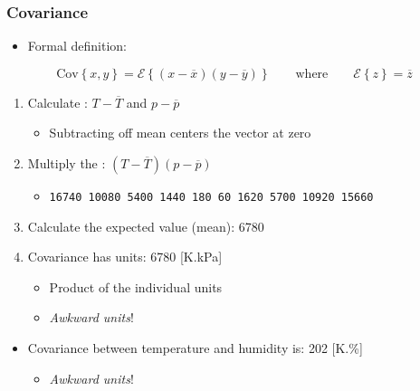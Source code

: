 \begin{frame}\frametitle{Covariance}
	\begin{itemize}
		\item	Formal definition:
	\end{itemize}
	$$ \text{Cov}\left\{x, y\right\} = \mathcal{E}\left\{ (x - \overline{x}) (y - \overline{y})\right\} \qquad \text{where} \qquad \mathcal{E}\left\{ z \right\} = \overline{z} $$

	\begin{enumerate}
		\item	Calculate {\color{purple}{deviation variables}}: $T - \overline{T}$ and $p - \overline{p}$
		\begin{itemize}
			\item	Subtracting off mean centers the vector at zero
		\end{itemize}
		\item	Multiply the {\color{purple}{centered vectors}}: $(T - \overline{T}) (p - \overline{p})$
		\begin{itemize}
			\item	\texttt{16740 10080 5400 1440 180 60 1620 5700 10920 15660}
		\end{itemize}
		\item	Calculate the expected value (mean): 6780
		\item	Covariance has units: 6780 [K.kPa]
		\begin{itemize}
			\item	Product of the individual units
			\item	\emph{Awkward units}!
		\end{itemize}
	\end{enumerate}

	\vspace{6pt}
	\begin{itemize}
		\item	Covariance between temperature and humidity is: 202 [K.\%]
		\begin{itemize}
			\item	\emph{Awkward units}!
		\end{itemize}
	\end{itemize}
\end{frame}

